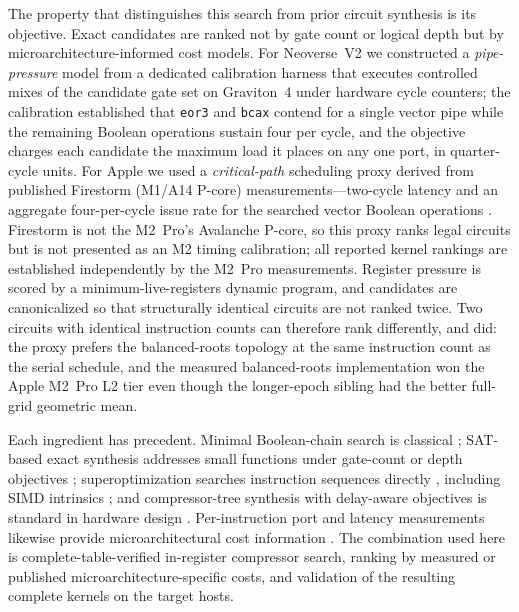 \documentclass[fleqn,10pt]{wlscirep}
\begin{document}
The property that distinguishes this search from prior circuit synthesis is its objective. Exact candidates are ranked not by gate count or logical depth but by microarchitecture-informed cost models. For Neoverse~V2 we constructed a \emph{pipe-pressure} model from a dedicated calibration harness that executes controlled mixes of the candidate gate set on Graviton~4 under hardware cycle counters; the calibration established that \texttt{eor3} and \texttt{bcax} contend for a single vector pipe while the remaining Boolean operations sustain four per cycle, and the objective charges each candidate the maximum load it places on any one port, in quarter-cycle units. For Apple we used a \emph{critical-path} scheduling proxy derived from published Firestorm (M1/A14 P-core) measurements---two-cycle latency and an aggregate four-per-cycle issue rate for the searched vector Boolean operations \cite{johnsonAppleCpu}. Firestorm is not the M2~Pro's Avalanche P-core, so this proxy ranks legal circuits but is not presented as an M2 timing calibration; all reported kernel rankings are established independently by the M2~Pro measurements. Register pressure is scored by a minimum-live-registers dynamic program, and candidates are canonicalized so that structurally identical circuits are not ranked twice. Two circuits with identical instruction counts can therefore rank differently, and did: the proxy prefers the balanced-roots topology at the same instruction count as the serial schedule, and the measured balanced-roots implementation won the Apple M2~Pro L2 tier even though the longer-epoch sibling had the better full-grid geometric mean.

Each ingredient has precedent. Minimal Boolean-chain search is classical \cite{knuth2011}; SAT-based exact synthesis addresses small functions under gate-count or depth objectives \cite{soeken2018}; superoptimization searches instruction sequences directly \cite{massalin1987,sasnauskas2017souper}, including SIMD intrinsics \cite{liu2024minotaur}; and compressor-tree synthesis with delay-aware objectives is standard in hardware design \cite{verma2007}. Per-instruction port and latency measurements likewise provide microarchitectural cost information \cite{abel2019uops,johnsonAppleCpu}. The combination used here is complete-table-verified in-register compressor search, ranking by measured or published microarchitecture-specific costs, and validation of the resulting complete kernels on the target hosts.
\end{document}
